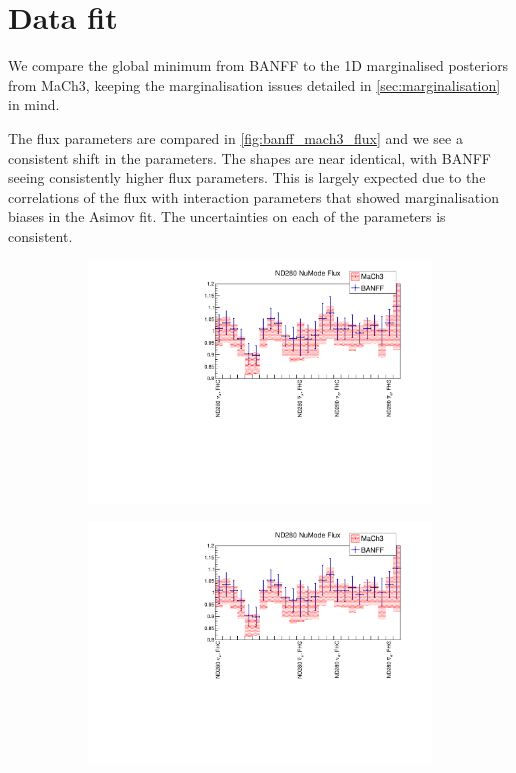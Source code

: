 \section{Data fit}
We compare the global minimum from BANFF to the 1D marginalised posteriors from MaCh3, keeping the marginalisation issues detailed in \autoref{sec:marginalisation} in mind.

The flux parameters are compared in \autoref{fig:banff_mach3_flux} and we see a consistent shift in the parameters. The shapes are near identical, with BANFF seeing consistently higher flux parameters. This is largely expected due to the correlations of the flux with interaction parameters that showed marginalisation biases in the Asimov fit. The uncertainties on each of the parameters is consistent.
\begin{figure}[h]
	\begin{subfigure}[t]{0.49\textwidth}
		\includegraphics[width=\textwidth, trim={10mm 0mm 18mm 0mm}, clip, page=1]{figures/mach3/banff/mach3banff}
	\end{subfigure}
	\begin{subfigure}[t]{0.49\textwidth}
		\includegraphics[width=\textwidth, trim={10mm 0mm 18mm 0mm}, clip, page=2]{figures/mach3/banff/mach3banff}
	\end{subfigure}
	

\end{figure}
